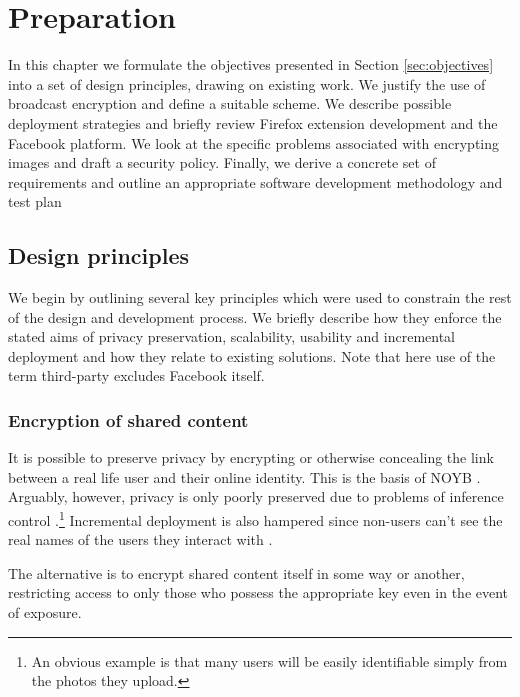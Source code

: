 \chapter{Preparation}\label{ch:preparation}

In this chapter we formulate the objectives presented in Section \ref{sec:objectives} into a set of design principles, drawing on existing work. We justify the use of broadcast encryption and define a suitable scheme. We describe possible deployment strategies and briefly review Firefox extension development and the Facebook platform. We look at the specific problems associated with encrypting images and draft a security policy. Finally, we derive a concrete set of requirements and outline an appropriate software development methodology and test plan


\FloatBarrier
\section{Design principles}
\label{sec:principles}

We begin by outlining several key principles which were used to constrain the rest of the design and development process. We briefly describe how they enforce the stated aims of privacy preservation, scalability, usability and incremental deployment and how they relate to existing solutions. Note that here use of the term third-party excludes Facebook itself.


\FloatBarrier
\subsection{Encryption of shared content}

It is possible to preserve privacy by encrypting or otherwise concealing the link between a real life user and their online identity. This is the basis of NOYB \cite{noyb}. Arguably, however, privacy is only poorly preserved due to problems of inference control \cite{ross}.\footnote{An obvious example is that many users will be easily identifiable simply from the photos they upload.} Incremental deployment is also hampered since non-users can't see the real names of the users they interact with \cite{facecloak}.

The alternative is to encrypt shared content itself in some way or another, restricting access to only those who possess the appropriate key even in the event of exposure.


